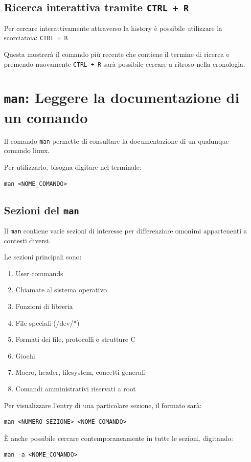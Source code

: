 \documentclass[a4paper]{report}
\newenvironment{code}{\begin{tcolorbox}[size=small]}{\end{tcolorbox}}
\begin{document}
\subsection*{Ricerca interattiva tramite \texttt{CTRL + R}}
Per cercare interattivamente attraverso la history è possibile utilizzare la scorciatoia: \texttt{CTRL + R}

Questa mostrerà il comando più recente che contiene il termine di ricerca e premendo nuovamente \texttt{CTRL + R} sarà possibile cercare a ritroso nella cronologia.

\section{\texttt{man}: Leggere la documentazione di un comando}

Il comando \texttt{man} permette di consultare la documentazione di un qualunque comando linux.

Per utilizzarlo, bisogna digitare nel terminale:

\begin{code}
\begin{lstlisting}
man <NOME_COMANDO>
\end{lstlisting}
\end{code}

\subsection*{Sezioni del \texttt{man}}

Il \texttt{man} contiene varie sezioni di interesse per differenziare omonimi appartenenti a contesti diversi.

Le sezioni principali sono:

\begin{enumerate}
	\setlength{\itemsep}{0pt}
	\item User commands
	\item Chiamate al sistema operativo
	\item Funzioni di libreria
	\item File speciali (/dev/*)
	\item Formati dei file, protocolli e strutture C
	\item Giochi
	\item Macro, header, filesystem, concetti generali
	\item Comandi amministrativi riservati a root
\end{enumerate}

\begin{code}
Per visualizzare l'entry di una particolare sezione, il formato sarà: 
\begin{lstlisting}
man <NUMERO_SEZIONE> <NOME_COMANDO>
\end{lstlisting}

È anche possibile cercare contemporaneamente in tutte le sezioni, digitando:
\begin{lstlisting}
man -a <NOME_COMANDO>
\end{lstlisting}
\end{code}
\end{document}
